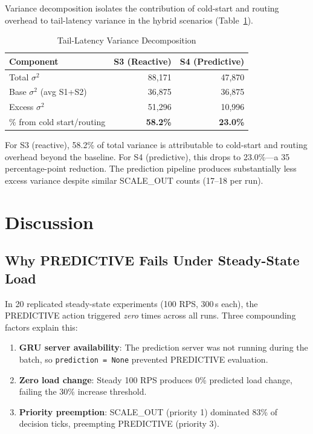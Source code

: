 \documentclass[conference,letterpaper]{IEEEtran}
\begin{document}
Variance decomposition isolates the contribution of cold-start and routing overhead to tail-latency variance in the hybrid scenarios (Table~\ref{tab:variance}).

\begin{table}[htbp]
\caption{Tail-Latency Variance Decomposition}
\label{tab:variance}
\centering
\small
\begin{tabular}{lrr}
\toprule
\textbf{Component} & \textbf{S3 (Reactive)} & \textbf{S4 (Predictive)} \\
\midrule
Total $\sigma^2$ & 88{,}171 & 47{,}870 \\
Base $\sigma^2$ (avg S1+S2) & 36{,}875 & 36{,}875 \\
Excess $\sigma^2$ & 51{,}296 & 10{,}996 \\
\% from cold start/routing & \textbf{58.2\%} & \textbf{23.0\%} \\
\bottomrule
\end{tabular}
\end{table}

For S3 (reactive), 58.2\% of total variance is attributable to cold-start and routing overhead beyond the baseline. For S4 (predictive), this drops to 23.0\%---a 35 percentage-point reduction. The prediction pipeline produces substantially less excess variance despite similar SCALE\_OUT counts (17--18 per run).

\section{Discussion}

\subsection{Why PREDICTIVE Fails Under Steady-State Load}

In 20 replicated steady-state experiments (100 RPS, 300\,s each), the PREDICTIVE action triggered \textit{zero} times across all runs. Three compounding factors explain this:

\begin{enumerate}
    \item \textbf{GRU server availability}: The prediction server was not running during the batch, so \texttt{prediction = None} prevented PREDICTIVE evaluation.
    \item \textbf{Zero load change}: Steady 100 RPS produces 0\% predicted load change, failing the 30\% increase threshold.
    \item \textbf{Priority preemption}: SCALE\_OUT (priority 1) dominated 83\% of decision ticks, preempting PREDICTIVE (priority 3).
\end{enumerate}
\end{document}
